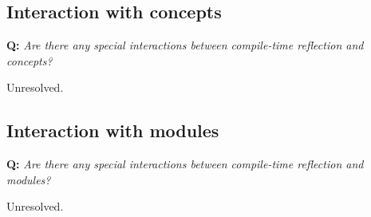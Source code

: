 \subsection{Interaction with concepts}

\textbf{Q:} {\em Are there any special interactions between compile-time
reflection and concepts?}

Unresolved.

\subsection{Interaction with modules}

\textbf{Q:} {\em Are there any special interactions between compile-time
reflection and modules?}

Unresolved.

